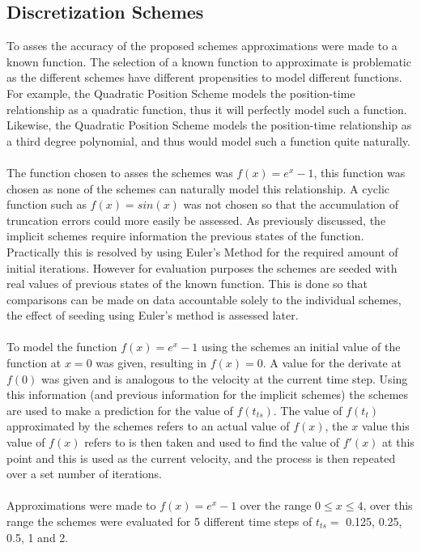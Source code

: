 \subsection{Discretization Schemes}
To asses the accuracy of the proposed schemes approximations were made to a known function. The selection of a known function to approximate is problematic as the different schemes have different propensities to model different functions. For example, the Quadratic Position Scheme models the position-time relationship as a quadratic function, thus it will perfectly model such a function. Likewise, the Quadratic Position Scheme models the position-time relationship as a third degree polynomial, and thus would model such a function quite naturally.
\\\\
The function chosen to asses the schemes was $f(x)=e^x-1$, this function was chosen as none of the schemes can naturally model this relationship. A cyclic function such as $f(x)=sin(x)$ was not chosen so that the accumulation of truncation errors could more easily be assessed. As previously discussed, the implicit schemes require information the previous states of the function. Practically this is resolved by using Euler's Method for the required amount of initial iterations. However for evaluation purposes the schemes are seeded with real values of previous states of the known function. This is done so that comparisons can be made on data accountable solely to the individual schemes, the effect of seeding using Euler's method is assessed later.
\\\\
To model the function $f(x)=e^x-1$ using the schemes an initial value of the function at $x=0$ was given, resulting in $f(x)=0$. A value for the derivate at $f(0)$ was given and is analogous to the velocity at the current time step. Using this information (and previous information for the implicit schemes) the schemes are used to make a prediction for the value of $f(t_{ts})$. The value of $f(t_{t})$ approximated by the schemes refers to an actual value of $f(x)$, the $x$ value this value of $f(x)$ refers to is then taken and used to find the value of $f'(x)$ at this point and this is used as the current velocity, and the process is then repeated over a set number of iterations.
\\\\
Approximations were made to $f(x)=e^x-1$ over the range $0\leqslant x \leqslant 4$, over this range the schemes were evaluated for 5 different time steps of $t_{ts}=$ 0.125, 0.25, 0.5, 1 and 2.
